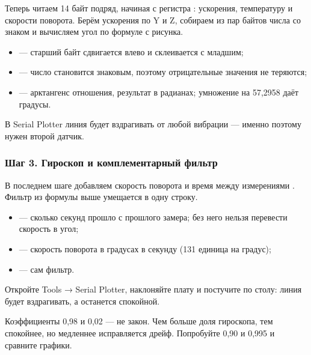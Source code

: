 Теперь читаем 14 байт подряд, начиная с регистра : ускорения, температуру и скорости поворота.
Берём ускорения по Y и Z, собираем из пар байтов числа со знаком и вычисляем угол по формуле с рисунка.


\begin{itemize}[leftmargin=*]
  \item {} --- старший байт сдвигается влево и склеивается с младшим;
  \item {} --- число становится знаковым, поэтому отрицательные значения не теряются;
  \item {} --- арктангенс отношения, результат в радианах; умножение на 57,2958 даёт градусы.
\end{itemize}

В Serial Plotter линия  будет вздрагивать от любой вибрации --- именно поэтому нужен второй датчик.

\subsubsection{Шаг 3. Гироскоп и комплементарный фильтр}

В последнем шаге добавляем скорость поворота  и время между измерениями . Фильтр из формулы
выше умещается в одну строку.


\begin{itemize}[leftmargin=*]
  \item {} --- сколько секунд прошло с прошлого замера; без него нельзя перевести скорость в угол;
  \item {} --- скорость поворота в градусах в секунду (131 единица на градус);
  \item {} --- сам фильтр.
\end{itemize}

Откройте \textsf{Tools → Serial Plotter}, наклоняйте плату и постучите по столу: линия  будет
вздрагивать, а  останется спокойной.

\begin{tip}
Коэффициенты 0,98 и 0,02 --- не закон. Чем больше доля гироскопа, тем спокойнее, но медленнее
исправляется дрейф. Попробуйте 0,90 и 0,995 и сравните графики.
\end{tip}

